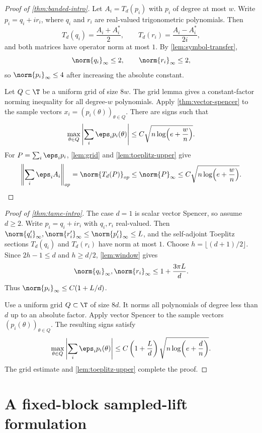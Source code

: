 \begin{proof}[Proof of \cref{thm:banded-intro}]
Let $A_i=T_d(p_i)$ with $p_i$ of degree at most $w$.  Write
$p_i=q_i+ir_i$, where $q_i$ and $r_i$ are real-valued trigonometric polynomials.
Then
\[
   T_d(q_i)=\frac{A_i+A_i^*}{2},
   \qquad
   T_d(r_i)=\frac{A_i-A_i^*}{2i},
\]
and both matrices have operator norm at most $1$.  By
\cref{lem:symbol-transfer},
\[
   \norm{q_i}_\infty\le2,
   \qquad
   \norm{r_i}_\infty\le2,
\]
so $\norm{p_i}_\infty\le4$ after increasing the absolute constant.

Let $Q\subset\T$ be a uniform grid of size $8w$.  The grid lemma gives a
constant-factor norming inequality for all degree-$w$ polynomials.  Apply
\cref{thm:vector-spencer} to the sample vectors
$x_i=(p_i(\theta))_{\theta\in Q}$.  There are signs such that
\[
   \max_{\theta\in Q}\left|\sum_i\eps_i p_i(\theta)\right|
   \le C\sqrt{n\log\!\left(e+\frac wn\right)} .
\]
For $P=\sum_i\eps_i p_i$, \cref{lem:grid} and \cref{lem:toeplitz-upper} give
\[
   \left\|\sum_i\eps_i A_i\right\|_{op}
   =\norm{T_d(P)}_{op}
   \le\norm{P}_\infty
   \le C\sqrt{n\log\!\left(e+\frac wn\right)} .
\]
\end{proof}

\begin{proof}[Proof of \cref{thm:tame-intro}]
The case $d=1$ is scalar vector Spencer, so assume $d\ge2$.  Write
$p_i=q_i+ir_i$ with $q_i,r_i$ real-valued.  Then
$\norm{q_i'}_\infty,\norm{r_i'}_\infty\le\norm{p_i'}_\infty\le L$, and the
self-adjoint Toeplitz sections $T_d(q_i)$ and $T_d(r_i)$ have norm at most $1$.
Choose $h=\lfloor(d+1)/2\rfloor$.  Since $2h-1\le d$ and $h\ge d/2$,
\cref{lem:window} gives
\[
   \norm{q_i}_\infty,\norm{r_i}_\infty
   \le 1+\frac{3\pi L}{d} .
\]
Thus $\norm{p_i}_\infty\le C(1+L/d)$.

Use a uniform grid $Q\subset\T$ of size $8d$.  It norms all polynomials of
degree less than $d$ up to an absolute factor.  Apply vector Spencer to the
sample vectors $(p_i(\theta))_{\theta\in Q}$.  The resulting signs satisfy
\[
   \max_{\theta\in Q}\left|\sum_i\eps_i p_i(\theta)\right|
   \le C\left(1+\frac Ld\right)
      \sqrt{n\log\!\left(e+\frac dn\right)} .
\]
The grid estimate and \cref{lem:toeplitz-upper} complete the proof.
\end{proof}

\section{A fixed-block sampled-lift formulation}\label{app:lifts}

